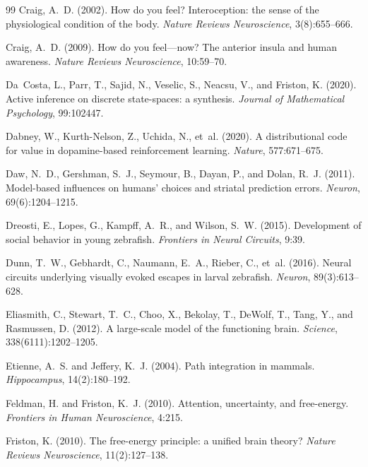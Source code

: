 \documentclass[12pt]{article}
\begin{document}
\begin{thebibliography}{99}
Craig, A.~D. (2002).
How do you feel? Interoception: the sense of the physiological condition of the body.
\textit{Nature Reviews Neuroscience}, 3(8):655--666.

Craig, A.~D. (2009).
How do you feel---now? The anterior insula and human awareness.
\textit{Nature Reviews Neuroscience}, 10:59--70.

Da~Costa, L., Parr, T., Sajid, N., Veselic, S., Neacsu, V., and Friston, K. (2020).
Active inference on discrete state-spaces: a synthesis.
\textit{Journal of Mathematical Psychology}, 99:102447.

Dabney, W., Kurth-Nelson, Z., Uchida, N., et~al. (2020).
A distributional code for value in dopamine-based reinforcement learning.
\textit{Nature}, 577:671--675.

Daw, N.~D., Gershman, S.~J., Seymour, B., Dayan, P., and Dolan, R.~J. (2011).
Model-based influences on humans' choices and striatal prediction errors.
\textit{Neuron}, 69(6):1204--1215.

Dreosti, E., Lopes, G., Kampff, A.~R., and Wilson, S.~W. (2015).
Development of social behavior in young zebrafish.
\textit{Frontiers in Neural Circuits}, 9:39.

Dunn, T.~W., Gebhardt, C., Naumann, E.~A., Rieber, C., et~al. (2016).
Neural circuits underlying visually evoked escapes in larval zebrafish.
\textit{Neuron}, 89(3):613--628.

Eliasmith, C., Stewart, T.~C., Choo, X., Bekolay, T., DeWolf, T., Tang, Y., and Rasmussen, D. (2012).
A large-scale model of the functioning brain.
\textit{Science}, 338(6111):1202--1205.

Etienne, A.~S. and Jeffery, K.~J. (2004).
Path integration in mammals.
\textit{Hippocampus}, 14(2):180--192.

Feldman, H. and Friston, K.~J. (2010).
Attention, uncertainty, and free-energy.
\textit{Frontiers in Human Neuroscience}, 4:215.

Friston, K. (2010).
The free-energy principle: a unified brain theory?
\textit{Nature Reviews Neuroscience}, 11(2):127--138.


\end{thebibliography}
\end{document}
